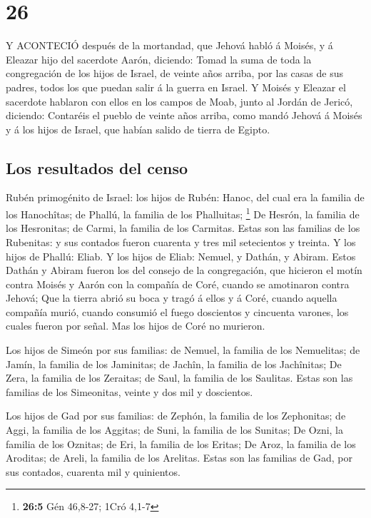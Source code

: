\hypertarget{section-25}{%
\section{26}\label{section-25}}

 Y ACONTECIÓ después de la mortandad, que Jehová habló á
Moisés, y á Eleazar hijo del sacerdote Aarón, diciendo: 
Tomad la suma de toda la congregación de los hijos de Israel, de veinte
años arriba, por las casas de sus padres, todos los que puedan salir á
la guerra en Israel.  Y Moisés y Eleazar el sacerdote
hablaron con ellos en los campos de Moab, junto al Jordán de Jericó,
diciendo:  Contaréis el pueblo de veinte años arriba, como
mandó Jehová á Moisés y á los hijos de Israel, que habían salido de
tierra de Egipto.

\hypertarget{los-resultados-del-censo-1}{%
\subsection{Los resultados del censo}\label{los-resultados-del-censo-1}}

 Rubén primogénito de Israel: los hijos de Rubén: Hanoc, del
cual era la familia de los Hanochîtas; de Phallú, la familia de los
Phalluitas; \footnote{\textbf{26:5} Gén 46,8-27; 1Cró 4,1-7}
 De Hesrón, la familia de los Hesronitas; de Carmi, la
familia de los Carmitas.  Estas son las familias de los
Rubenitas: y sus contados fueron cuarenta y tres mil setecientos y
treinta.  Y los hijos de Phallú: Eliab.  Y los
hijos de Eliab: Nemuel, y Dathán, y Abiram. Estos Dathán y Abiram fueron
los del consejo de la congregación, que hicieron el motín contra Moisés
y Aarón con la compañía de Coré, cuando se amotinaron contra Jehová;
 Que la tierra abrió su boca y tragó á ellos y á Coré,
cuando aquella compañía murió, cuando consumió el fuego doscientos y
cincuenta varones, los cuales fueron por señal.  Mas los
hijos de Coré no murieron.

 Los hijos de Simeón por sus familias: de Nemuel, la
familia de los Nemuelitas; de Jamín, la familia de los Jaminitas; de
Jachîn, la familia de los Jachînitas;  De Zera, la familia
de los Zeraitas; de Saul, la familia de los Saulitas. 
Estas son las familias de los Simeonitas, veinte y dos mil y doscientos.

 Los hijos de Gad por sus familias: de Zephón, la familia
de los Zephonitas; de Aggi, la familia de los Aggitas; de Suni, la
familia de los Sunitas;  De Ozni, la familia de los
Oznitas; de Eri, la familia de los Eritas;  De Aroz, la
familia de los Aroditas; de Areli, la familia de los Arelitas.
 Estas son las familias de Gad, por sus contados, cuarenta
mil y quinientos.


